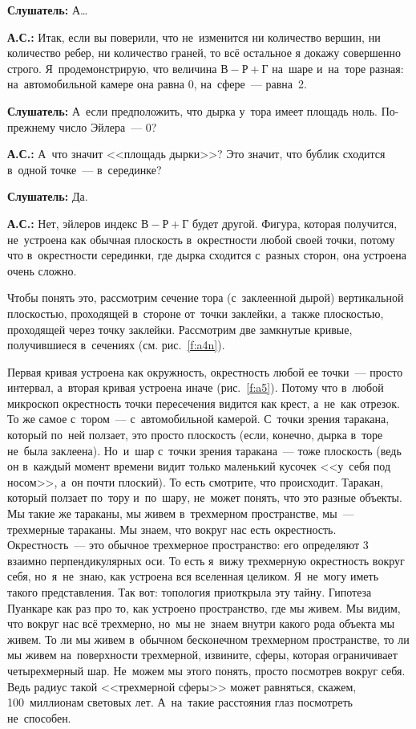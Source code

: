 \textbf{Слушатель:} А\ldots

\textbf{А.С.:} Итак, если вы поверили, что не~изменится ни количество вершин, ни количество ребер, ни
количество граней, то всё остальное я докажу совершенно строго.
 Я~продемонстрирую, что величина $\text{В}-\text{Р}+\text{Г}$
на~шаре и~на~торе разная: на~автомобильной камере она равна 0, на~сфере~--- равна~2.

\textbf{Слушатель:} А~если предположить, что дырка у~тора имеет площадь ноль. По-прежнему число Эйлера~---
0?

\textbf{А.С.:} А~что значит <<площадь дырки>>? Это значит, что бублик сходится в~одной точке~--- в~серединке?
%

\textbf{Слушатель:} Да.

\textbf{А.С.:} Нет, эйлеров индекс $\text{В}-\text{Р}+\text{Г}$ будет другой. Фигура, которая получится, не~устроена как обычная
плоскость в~окрестности любой своей точки,
потому что в~окрестности серединки, где дырка сходится с~разных сторон, она устроена очень сложно.

Чтобы понять это, рассмотрим сечение тора (с~заклеенной дырой) вертикальной плоскостью, проходящей
в~стороне от~точки заклейки, а~также плоскостью, проходящей через точку заклейки. Рассмотрим две
замкнутые кривые, получившиеся в~сечениях (см. рис.~\ref{f:a4n}).


Первая кривая устроена как окружность, окрестность любой ее точки~--- просто интервал, а~вторая
кривая устроена иначе (рис.~\ref{f:a5}). Потому что в~любой микроскоп окрестность точки пересечения видится
как крест, а~не~как отрезок. То же самое с~тором~--- с~автомобильной камерой. С~точки зрения
таракана, который по~ней ползает, это просто плоскость (если, конечно, дырка в~торе не~была
заклеена). Но~и~шар с~точки зрения таракана~--- тоже плоскость (ведь он в~каждый момент времени
видит только маленький кусочек <<у~себя под носом>>, а~он почти плоский). То есть смотрите, что
происходит. Таракан, который ползает по~тору и~по~шару, не~может понять, что это разные объекты. Мы
такие же тараканы, мы живем в~трехмерном пространстве, мы~--- трехмерные тараканы. Мы знаем, что
вокруг нас есть окрестность. Окрестность~--- это обычное трехмерное пространство: его определяют 3
взаимно перпендикулярных оси. То есть я~вижу трехмерную окрестность вокруг себя, но~я~не~знаю, как
устроена вся вселенная целиком. Я~не~могу иметь такого представления. Так вот: топология приоткрыла
эту тайну. Гипотеза Пуанкаре как раз про то, как устроено пространство, где мы живем. Мы видим,
что вокруг нас всё трехмерно, но~мы не~знаем внутри какого рода объекта мы живем. То ли мы живем
в~обычном бесконечном трехмерном пространстве, то ли мы живем на~поверхности трехмерной, извините,
сферы, которая ограничивает четырехмерный шар. Не~можем мы этого понять, просто посмотрев вокруг
себя. Ведь радиус такой <<трехмерной сферы>> может равняться, скажем, 100~миллионам световых лет.
А~на~такие расстояния глаз посмотреть не~способен.

